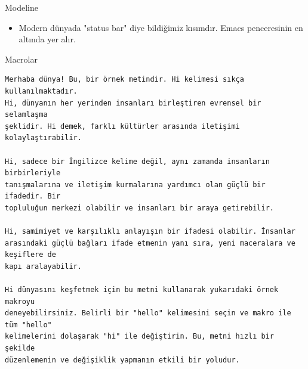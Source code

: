 \documentclass[presentation,smaller]{beamer}
\begin{document}
\begin{frame}[label={sec:org5f90eb8}]{Modeline}
\begin{itemize}
\item Modern dünyada "status bar" diye bildiğimiz kısımdır. Emacs penceresinin en
altında yer alır.
\end{itemize}
\end{frame}
\begin{frame}[label={sec:orgb9e2f87},fragile]{Macrolar}
 \begin{verbatim}
Merhaba dünya! Bu, bir örnek metindir. Hi kelimesi sıkça kullanılmaktadır.
Hi, dünyanın her yerinden insanları birleştiren evrensel bir selamlaşma
şeklidir. Hi demek, farklı kültürler arasında iletişimi kolaylaştırabilir.

Hi, sadece bir İngilizce kelime değil, aynı zamanda insanların birbirleriyle
tanışmalarına ve iletişim kurmalarına yardımcı olan güçlü bir ifadedir. Bir
topluluğun merkezi olabilir ve insanları bir araya getirebilir.

Hi, samimiyet ve karşılıklı anlayışın bir ifadesi olabilir. İnsanlar
arasındaki güçlü bağları ifade etmenin yanı sıra, yeni maceralara ve keşiflere de
kapı aralayabilir.

Hi dünyasını keşfetmek için bu metni kullanarak yukarıdaki örnek makroyu
deneyebilirsiniz. Belirli bir "hello" kelimesini seçin ve makro ile tüm "hello"
kelimelerini dolaşarak "hi" ile değiştirin. Bu, metni hızlı bir şekilde
düzenlemenin ve değişiklik yapmanın etkili bir yoludur.
\end{verbatim}
\end{frame}
\end{document}
